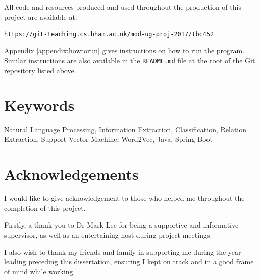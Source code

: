 \documentclass[a4paper]{report}
\begin{document}
\noindent All code and resources produced and used throughout the production of this project are available at:
\begin{center}
	\texttt{\href{https://git-teaching.cs.bham.ac.uk/mod-ug-proj-2017/tbc452}{https://git-teaching.cs.bham.ac.uk/mod-ug-proj-2017/tbc452}}
\end{center}
\noindent Appendix \ref{appendix:howtorun} gives instructions on how to run the program. Similar instructions are also available in the \texttt{README.md} file at the root of the Git repository listed above.

\section*{Keywords}
Natural Language Processing, Information Extraction, Classification, Relation Extraction, Support Vector Machine, Word2Vec, Java, Spring Boot

\section*{Acknowledgements}
I would like to give acknowledgement to those who helped me throughout the completion of this project.

Firstly, a thank you to Dr Mark Lee for being a supportive and informative supervisor, as well as an entertaining host during project meetings.

I also wish to thank my friends and family in supporting me during the year leading preceding this dissertation, ensuring I kept on track and in a good frame of mind while working.

\pagebreak

\tableofcontents
\listoffigures
\listoftables
\pagebreak




\pagebreak

\pagebreak

\pagebreak

\pagebreak

\pagebreak

\pagebreak

\pagebreak


\pagebreak



\pagebreak

\end{document}
